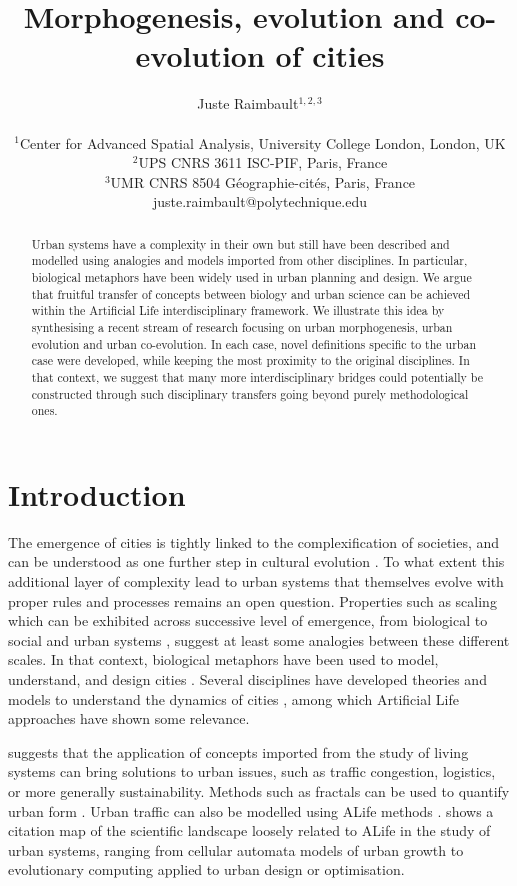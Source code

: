 \documentclass[letterpaper]{article}
\title{Morphogenesis, evolution and co-evolution of cities}
\author{Juste Raimbault$^{1,2,3}$\\
\mbox{}\\
$^1$Center for Advanced Spatial Analysis, University College London, London, UK\\
$^2$UPS CNRS 3611 ISC-PIF, Paris, France\\
$^3$UMR CNRS 8504 G{\'e}ographie-cit{\'e}s, Paris, France\\
juste.raimbault@polytechnique.edu} %
\begin{document}
\maketitle

\begin{abstract}
  Urban systems have a complexity in their own but still have been described and modelled using analogies and models imported from other disciplines. In particular, biological metaphors have been widely used in urban planning and design. We argue that fruitful transfer of concepts between biology and urban science can be achieved within the Artificial Life interdisciplinary framework. We illustrate this idea by synthesising a recent stream of research focusing on urban morphogenesis, urban evolution and urban co-evolution. In each case, novel definitions specific to the urban case were developed, while keeping the most proximity to the original disciplines. In that context, we suggest that many more interdisciplinary bridges could potentially be constructed through such disciplinary transfers going beyond purely methodological ones.
\end{abstract}



\section{Introduction}

The emergence of cities is tightly linked to the complexification of societies, and can be understood as one further step in cultural evolution \citep{sjoberg1965origin}. To what extent this additional layer of complexity lead to urban systems that themselves evolve with proper rules and processes remains an open question. Properties such as scaling which can be exhibited across successive level of emergence, from biological to social and urban systems \citep{youn2018scaling}, suggest at least some analogies between these different scales. In that context, biological metaphors have been used to model, understand, and design cities \citep{batty2009centenary}. Several disciplines have developed theories and models to understand the dynamics of cities \citep{pumain2020conclusion}, among which Artificial Life approaches have shown some relevance.

\cite{gershenson2013living} suggests that the application of concepts imported from the study of living systems can bring solutions to urban issues, such as traffic congestion, logistics, or more generally sustainability. Methods such as fractals can be used to quantify urban form \citep{chen2010modeling}. Urban traffic can also be modelled using ALife methods \citep{yoshioka2017macroscopic}. \cite{raimbault2020cities} shows a citation map of the scientific landscape loosely related to ALife in the study of urban systems, ranging from cellular automata models of urban growth to evolutionary computing applied to urban design or optimisation.
\end{document}
